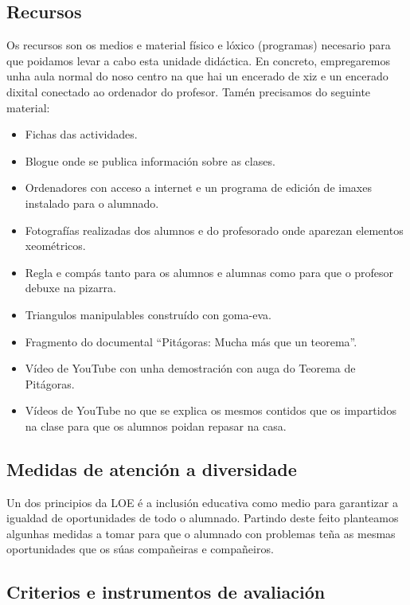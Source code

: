 \subsection{Recursos}
Os recursos son os medios e material físico e lóxico (programas) necesario para que poidamos levar a cabo esta unidade didáctica. En concreto, empregaremos unha aula normal do noso centro na que hai un encerado de xiz e un encerado dixital conectado ao ordenador do profesor. Tamén precisamos do seguinte material:
\begin{itemize}
    \item Fichas das actividades.
    \item Blogue onde se publica información sobre as clases.
    \item Ordenadores con acceso a internet e un programa de edición de imaxes instalado para o alumnado.
    \item Fotografías realizadas dos alumnos e do profesorado onde aparezan elementos xeométricos.
    \item Regla e compás tanto para os alumnos e alumnas como para que o profesor debuxe na pizarra.
    \item Triangulos manipulables construído con goma-eva.
    \item Fragmento do documental ``Pitágoras: Mucha más que un teorema''.
    \item Vídeo de YouTube con unha demostración con auga do Teorema de Pitágoras.
    \item Vídeos de YouTube no que se explica os mesmos contidos que os impartidos na clase para que os alumnos poidan repasar na casa.
\end{itemize}

\subsection{Medidas de atención a diversidade}

Un dos principios da LOE \cite{lomce} é a inclusión educativa como medio para garantizar a igualdad de oportunidades de todo o alumnado. Partindo deste feito planteamos algunhas medidas a tomar para que o alumnado con problemas teña as mesmas oportunidades que os súas compañeiras e compañeiros.


\subsection{Criterios e instrumentos de avaliación}

